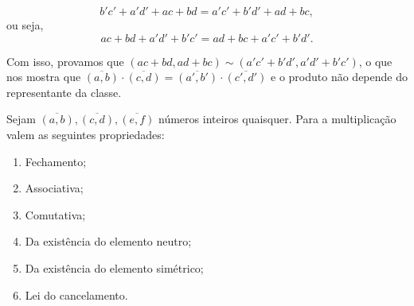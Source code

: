 \documentclass[../main.tex]{subfiles}
\begin{document}
\begin{dem}
    \[ b'c' +a'd' + ac + bd  = a'c' + b'd' + ad+ bc, \]
    ou seja,
    \[ ac + bd + a'd' + b'c' = ad + bc + a'c' + b'd'. \]
    
    Com isso, provamos que $ (ac+bd,ad+bc) \sim (a'c'+b'd',a'd'+b'c')$, o que nos mostra que $\overline{(a,b)} \cdot \overline{(c,d)} = 
    \overline{(a',b')} \cdot \overline{(c',d')}$ e o produto não depende do representante da classe.
\end{dem}
\begin{teo}\label{int-teo-produtoPropriedades}
    Sejam $\overline{(a,b)}, \overline{(c,d)}, \overline{(e,f)}$ números inteiros quaisquer. Para a multiplicação valem as seguintes propriedades:
    \begin{enumerate}[label=(\roman*)]
        \item Fechamento;
        \item Associativa;
        \item Comutativa;
        \item Da existência do elemento neutro; 
        \item Da existência do elemento simétrico;
        \item Lei do cancelamento.
    \end{enumerate}
\end{teo}
\end{document}
